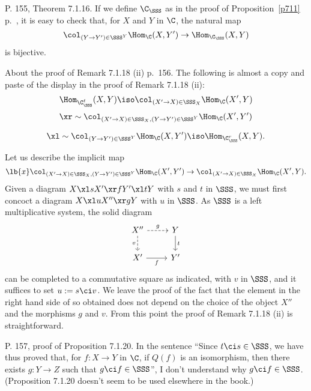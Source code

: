 \documentclass[12pt]{article}
\theoremstyle{remark}
\theoremstyle{definition}
\begin{document}

\begin{s}
P. 155, Theorem 7.1.16. If we define $\C_\SSS$ as in the proof of Proposition~\ref{p711} p.~, it is easy to check that, for $X$ and $Y$ in $\C$, the natural map 
$$
\col_{(Y\to Y')\in\SSS^Y}\Hom_\C(X,Y')\to\Hom_{\C_\SSS}(X,Y)
$$ 
is bijective.
\end{s}

%

\begin{s}%
%
About the proof of Remark 7.1.18 (ii) p.~156. The following is almost a copy and paste of the display in the proof of Remark 7.1.18 (ii): 
$$
\Hom_{\C_\SSS^\ell}(X,Y)\iso\col_{(X'\to X)\in\SSS_X}\Hom_\C(X',Y)
$$ 
$$
\xr\sim\col_{(X'\to X)\in\SSS_X,(Y\to Y')\in\SSS^Y}\Hom_\C(X',Y')
$$ 

$$\xl\sim\col_{(Y\to Y')\in\SSS^Y}\Hom_\C(X,Y')\iso\Hom_{\C_\SSS^r}(X,Y).$$ 

Let us describe the implicit map 
\begin{equation}\lb{x}
\col_{(X'\to X)\in\SSS_X,(Y\to Y')\in\SSS^Y}\Hom_\C(X',Y')\to\col_{(X'\to X)\in\SSS_X}\Hom_\C(X',Y).
\end{equation} 
Given a diagram $X\xl sX'\xr fY'\xl tY$ with $s$ and $t$ in $\SSS$, we must first concoct a diagram $X\xl uX''\xr gY$ with $u$ in $\SSS$. As $\SSS$ is a left multiplicative system, the solid diagram 
$$
\begin{tikzcd}
X''\ar[dashed]{d}[swap]{v}\ar[dashed]{r}{g}&Y\ar{d}{t}\\ 
X'\ar{r}[swap]{f}&Y'
\end{tikzcd}
$$ 
can be completed to a commutative square as indicated, with $v$ in $\SSS$, and it suffices to set $u:=s\ci v$. We leave the proof of the fact that the element in the right hand side of  so obtained does not depend on the choice of the object $X''$ and the morphisms $g$ and $v$. From this point the proof of Remark 7.1.18 (ii) is straightforward.
\end{s}

%

\begin{uspb} 
P. 157, proof of Proposition 7.1.20. In the sentence ``Since $t\ci s\in\SSS$, we have thus proved that, for $f:X\to Y$ in $\C$, if $Q(f)$ is an isomorphism, then there exists $g:Y\to Z$ such that $g\ci f\in\SSS$'', I don't understand why $g\ci f\in\SSS$. (Proposition 7.1.20 doesn't seem to be used elsewhere in the book.)
\end{uspb}
\end{document}
